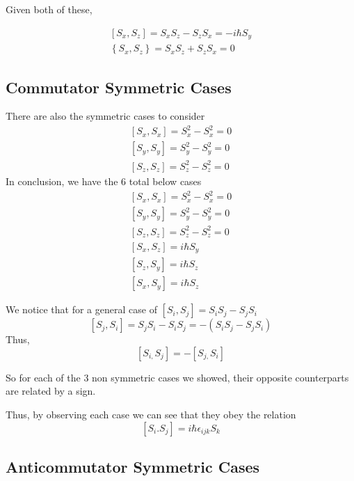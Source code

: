 \documentclass[]{article}
\begin{document}
Given both of these,

\[
\begin{align}
\left[ S_{x},S_{z} \right]  = S_{x}S_{z} - S_{z}S_{x} = -i\hbar S_{y} \\
\left\{ S_{x},S_{z} \right\}  =  S_{x}S_{z} + S_{z}S_{x} = 0
\end{align}
\]

\hypertarget{commutator-symmetric-cases}{%
\subsection{Commutator Symmetric
Cases}\label{commutator-symmetric-cases}}

There are also the symmetric cases to consider \[
\begin{align}
\left[ S_{x} ,S_{x}\right]  = S_{x}^{2}-S_{x}^{2}=0 \\
\left[ S_{y} ,S_{y}\right]  = S_{y}^{2}-S_{y}^{2}=0 \\
\left[ S_{z} ,S_{z}\right]  = S_{z}^{2}-S_{z}^{2}=0
\end{align}
\] In conclusion, we have the 6 total below cases \[
\begin{align}
\left[ S_{x} ,S_{x}\right]  = S_{x}^{2}-S_{x}^{2}=0 \\
\left[ S_{y} ,S_{y}\right]  = S_{y}^{2}-S_{y}^{2}=0 \\
\left[ S_{z} ,S_{z}\right]  = S_{z}^{2}-S_{z}^{2}=0 \\
\left[ S_{x},S_{z} \right]  =  i\hbar S_{y} \\ 
\left[ S_{z},S_{y} \right]  =  i\hbar S_{z} \\
\left[ S_{x},S_{y} \right] =  i\hbar S_{z}
\end{align}
\]

We notice that for a general case of
\([S_{i}, S_{j}]=S_{i}S_{j}-S_{j}S_{i}\) \[
[S_{j},S_{i}] = S_{j}S_{i}-S_{i}S_{j} = -(S_{i}S_{j}-S_{j}S_{i}) \]
Thus, \[[S_{i,} S_{j}] = -[S_{j,} S_{i}]\]

So for each of the 3 non symmetric cases we showed, their opposite
counterparts are related by a sign.

Thus, by observing each case we can see that they obey the relation \[
[S_{i}. S_{j}] = i\hbar\epsilon_{ijk}S_{k}
\]

\hypertarget{anticommutator-symmetric-cases}{%
\subsection{Anticommutator Symmetric
Cases}\label{anticommutator-symmetric-cases}}
\end{document}
